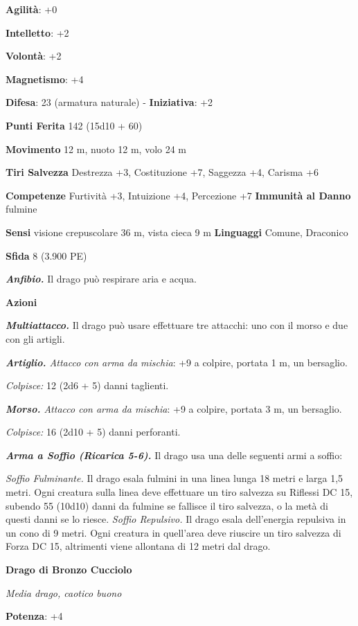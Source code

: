 \begin{multicols}{2}
\textbf{Agilità}: +0

\textbf{Intelletto}: +2

\textbf{Volontà}: +2

\textbf{Magnetismo}: +4

\textbf{Difesa}: 23 (armatura naturale) - \textbf{Iniziativa}: +2

\textbf{Punti Ferita} 142 (15d10 + 60)

\textbf{Movimento} 12 m, nuoto 12 m, volo 24 m

\textbf{Tiri Salvezza} Destrezza +3, Costituzione +7, Saggezza +4,
Carisma +6

\textbf{Competenze} Furtività +3, Intuizione +4, Percezione +7
\textbf{Immunità al Danno} fulmine

\textbf{Sensi} visione crepuscolare 36 m, vista cieca 9 m
\textbf{Linguaggi} Comune, Draconico

\textbf{Sfida} 8 (3.900 PE)\smallskip

\emph{\textbf{Anfibio.}} Il drago può respirare aria e acqua.

\smallskip\textbf{Azioni}

\emph{\textbf{Multiattacco.}} Il drago può usare effettuare tre
attacchi: uno con il morso e due con gli artigli.

\emph{\textbf{Artiglio.} Attacco con arma da mischia}: +9 a colpire,
portata 1 m, un bersaglio.

\emph{Colpisce:} 12 (2d6 + 5) danni taglienti.

\emph{\textbf{Morso.} Attacco con arma da mischia}: +9 a colpire,
portata 3 m, un bersaglio.

\emph{Colpisce:} 16 (2d10 + 5) danni perforanti.

\emph{\textbf{Arma a Soffio (Ricarica 5-6).}} Il drago usa una delle
seguenti armi a soffio:

\emph{Soffio Fulminante.} Il drago esala fulmini in una linea lunga 18
metri e larga 1,5 metri. Ogni creatura sulla linea deve effettuare un
tiro salvezza su Riflessi DC 15, subendo 55 (10d10) danni da fulmine se
fallisce il tiro salvezza, o la metà di questi danni se lo riesce.
\emph{Soffio Repulsivo.} Il drago esala dell'energia repulsiva in un
cono di 9 metri. Ogni creatura in quell'area deve riuscire un tiro
salvezza di Forza DC 15, altrimenti viene allontana di 12 metri dal
drago.

\textbf{Drago di Bronzo Cucciolo}

\emph{Media drago, caotico buono}

\textbf{Potenza}: +4


\end{multicols}
